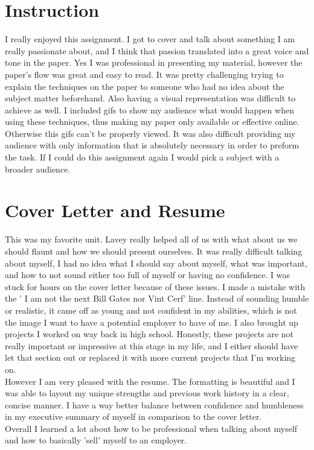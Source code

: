 \documentclass[12pt,letterpaper]{article}
\begin{document}
\newpage
\section{Instruction}
I really enjoyed this assignment. I got to cover and talk about something I am really passionate about, and I think that passion translated into a great voice and tone in the paper. Yes I was professional in presenting my material, however the paper's flow was great and easy to read. It was pretty challenging trying to explain the techniques on the paper to someone who had no idea about the subject matter beforehand. Also having a visual representation was difficult to achieve as well. I included gifs to show my audience what would happen when using these techniques, thus making my paper only available or effective online. Otherwise this gifs can't be properly viewed. It was also difficult providing my audience with only information that is absolutely necessary in order to preform the task. If I could do this assignment again I would pick a subject with a broader audience. 

\newpage
\section{Cover Letter and Resume}
This was my favorite unit. Lavey really helped all of us with what about us we should flaunt and how we should present ourselves. It was really difficult talking about myself, I had no idea what I should say about myself, what was important, and how to not sound either too full of myself or having no confidence. I was stuck for hours on the cover letter because of these issues. I made a mistake with the ' I am not the next Bill Gates nor Vint Cerf' line. Instead of sounding humble or realistic, it came off as young and not confident in my abilities, which is not the image I want to have a potential employer to have of me. I also brought up projects I worked on way back in high school. Honestly, these projects are not really important or impressive at this stage in my life, and I either should have let that section out or replaced it with more current projects that I'm working on.\\
However I am very pleased with the resume. The formatting is beautiful and I was able to layout my unique strengths and previous work history in a clear, concise manner. I have a way better balance between confidence and humbleness in my executive summary of myself in comparison to the cover letter. \\
Overall I learned a lot about how to be professional when talking about myself and how to basically 'sell' myself to an employer. 
\end{document}
